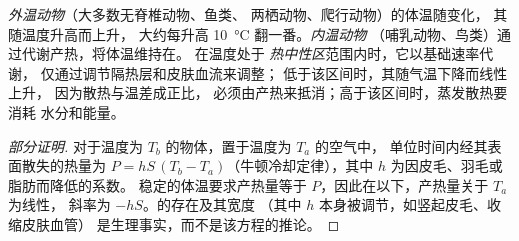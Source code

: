 \begin{proposition}[内温动物与外温动物]\label{prop:b1:organism-environment:thermo}
\emph{外温动物}（大多数无脊椎动物、鱼类、
两栖动物、爬行动物）的体温随变化，
其随温度升高而上升，
大约每升高 \qty{10}{\celsius} 翻一番。\emph{内温动物}
（哺乳动物、鸟类）通过代谢产热，将体温维持在。
在温度处于
\emph{热中性区}范围内时，它以基础速率代谢，
仅通过调节隔热层和皮肤血流来调整；
低于该区间时，其随气温下降而线性上升，
因为散热与温差成正比，
必须由产热来抵消；高于该区间时，蒸发散热要消耗
水分和能量。
\end{proposition}
\begin{proof}[部分证明]
对于温度为 $T_b$ 的物体，置于温度为 $T_a$ 的空气中，
单位时间内经其表面散失的热量为 $P = hS\,(T_b - T_a)$（牛顿冷却定律），其中 $h$
为因皮毛、羽毛或脂肪而降低的系数。
稳定的体温要求产热量等于 $P$，因此在以下，产热量关于 $T_a$ 为线性，
斜率为 $-hS$。的存在及其宽度
（其中 $h$ 本身被调节，如竖起皮毛、收缩皮肤血管）
是生理事实，而不是该方程的推论。
\end{proof}


